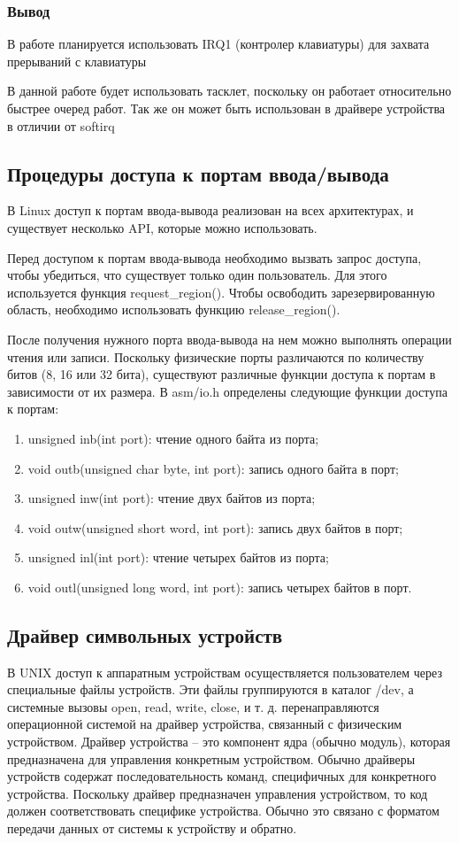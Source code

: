 \subsubsection{Вывод}
В работе планируется использовать IRQ1 (контролер клавиатуры) для захвата прерываний с клавиатуры

В данной работе будет использовать тасклет, поскольку он работает относительно быстрее очеред работ. 
Так же он может быть использован в драйвере устройства в отличии от softirq

\subsection{Процедуры доступа к портам ввода/вывода}
В Linux доступ к портам ввода-вывода реализован на всех архитектурах, и существует несколько API, которые можно использовать.

Перед доступом к портам ввода-вывода необходимо вызвать запрос доступа, чтобы убедиться, что существует только один пользователь. 
Для этого используется функция request\_region(). 
Чтобы освободить зарезервированную область, необходимо использовать функцию release\_region().

После получения нужного порта ввода-вывода на нем можно выполнять операции чтения или записи. 
Поскольку физические порты различаются по количеству битов (8, 16 или 32 бита), существуют различные функции доступа к портам в зависимости от их размера. 
В asm/io.h определены следующие функции доступа к портам:
\begin{enumerate}
	\item unsigned inb(int port): чтение одного байта из порта;
	\item void outb(unsigned char byte, int port): запись одного байта в порт;
	\item unsigned inw(int port): чтение двух байтов из порта; 
	\item void outw(unsigned short word, int port): запись двух байтов в порт; 
	\item unsigned inl(int port): чтение четырех байтов из порта; 
	\item void outl(unsigned long word, int port): запись четырех байтов в порт. 
\end{enumerate}

\subsection{Драйвер символьных устройств}
В UNIX доступ к аппаратным устройствам осуществляется пользователем через специальные файлы устройств. 
Эти файлы группируются в каталог /dev, а системные вызовы open, read, write, close, и т. д. перенаправляются операционной системой на драйвер устройства, связанный с физическим устройством.
Драйвер устройства – это компонент ядра (обычно модуль), которая предназначена для управления конкретным устройством. 
Обычно драйверы устройств содержат последовательность команд, специфичных для конкретного устройства. 
Поскольку драйвер предназначен управления устройством, то код должен соответствовать специфике устройства. 
Обычно это связано с форматом передачи данных от системы к устройству и обратно.

